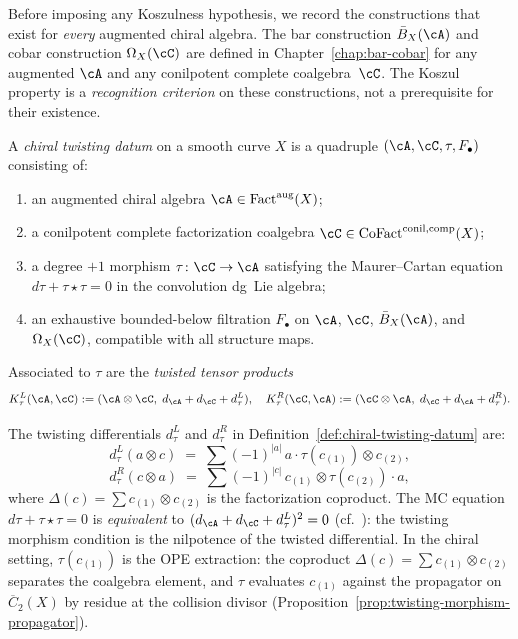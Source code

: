 Before imposing any Koszulness hypothesis, we record the
constructions that exist for \emph{every} augmented chiral algebra.
The bar construction $\bar{B}_X(\cA)$ and cobar construction
$\Omega_X(\cC)$ are defined in
Chapter~\ref{chap:bar-cobar} for any augmented $\cA$ and any
conilpotent complete coalgebra~$\cC$.  The Koszul property
is a \emph{recognition criterion} on these constructions,
not a prerequisite for their existence.

\begin{definition}\label{def:chiral-twisting-datum}
A \emph{chiral twisting datum} on a smooth curve $X$ is a quadruple
$(\cA, \cC, \tau, F_\bullet)$ consisting of:
\begin{enumerate}
\item an augmented chiral algebra
  $\cA \in \operatorname{Fact}^{\mathrm{aug}}(X)$;
\item a conilpotent complete factorization coalgebra
  $\cC \in \operatorname{CoFact}^{\mathrm{conil,comp}}(X)$;
\item a degree $+1$ morphism
  $\tau\colon \cC \to \cA$ satisfying the Maurer--Cartan equation
  $d\tau + \tau \star \tau = 0$ in the convolution dg~Lie algebra;
\item an exhaustive bounded-below filtration $F_\bullet$ on $\cA$,
  $\cC$, $\bar{B}_X(\cA)$, and $\Omega_X(\cC)$, compatible with
  all structure maps.
\end{enumerate}
Associated to $\tau$ are the \emph{twisted tensor products}
\[
K_\tau^L(\cA,\cC) := (\cA \otimes \cC,\; d_\cA + d_\cC + d_\tau^L),
\quad
K_\tau^R(\cC,\cA) := (\cC \otimes \cA,\; d_\cC + d_\cA + d_\tau^R).
\]
\end{definition}

\begin{remark}
\label{rem:explicit-twisted-differential}
The twisting differentials $d_\tau^L$ and $d_\tau^R$ in
Definition~\ref{def:chiral-twisting-datum} are:
\begin{equation}\label{eq:chiral-twisted-differential-L}
d_\tau^L(a \otimes c)
\;=\;
\sum (-1)^{|a|}\, a \cdot \tau(c_{(1)}) \otimes c_{(2)},
\end{equation}
\begin{equation}\label{eq:chiral-twisted-differential-R}
d_\tau^R(c \otimes a)
\;=\;
\sum (-1)^{|c|}\, c_{(1)} \otimes \tau(c_{(2)}) \cdot a,
\end{equation}
where $\Delta(c) = \sum c_{(1)} \otimes c_{(2)}$ is the factorization
coproduct.  The MC equation $d\tau + \tau \star \tau = 0$ is
\emph{equivalent} to $(d_\cA + d_\cC + d_\tau^L)^2 = 0$
\textup{(}cf.\ \cite[Lemma~2.1.4]{LV12}\textup{)}: the twisting
morphism condition is the nilpotence of the twisted differential.
In the chiral setting, $\tau(c_{(1)})$ is the OPE extraction:
the coproduct $\Delta(c) = \sum c_{(1)} \otimes c_{(2)}$ separates
the coalgebra element, and $\tau$ evaluates $c_{(1)}$ against the
propagator on~$\overline{C}_2(X)$ by residue at the collision
divisor
\textup{(}Proposition~\textup{\ref{prop:twisting-morphism-propagator})}.
\end{remark}

